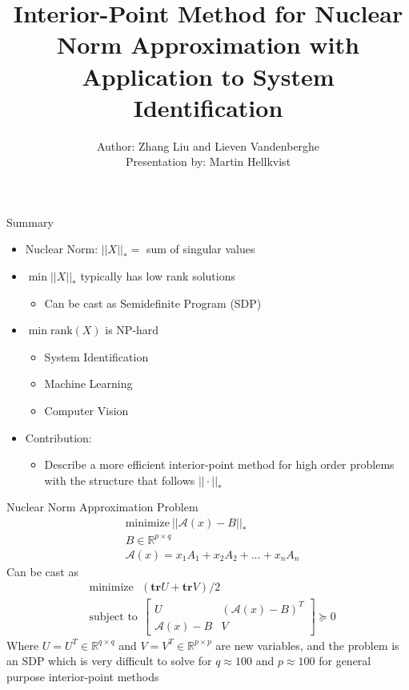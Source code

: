 \documentclass{beamer}
\title{Interior-Point Method for Nuclear Norm Approximation with Application to System Identification}
\author{Author: Zhang Liu and Lieven Vandenberghe \\ \footnotesize Presentation by: Martin Hellkvist}
\newcommand{\mA}{\mathcal{A}}
\begin{document}
\begin{frame}[plain]
    \maketitle
\end{frame}
\begin{frame}{Summary}
	\begin{itemize}
		\item Nuclear Norm: $ ||X||_* =$ sum of singular values
		\item $ \min ||X||_* $ typically has low rank solutions
		\begin{itemize}
			\item Can be cast as Semidefinite Program (SDP)
		\end{itemize}
		\item $ \min \text{rank}(X) $ is NP-hard
		\begin{itemize}
			\item System Identification
			\item Machine Learning
			\item Computer Vision
		\end{itemize}
		\item Contribution:
		\begin{itemize}
			\item Describe a more efficient interior-point method for high order problems with the structure that follows $ ||\cdot||_* $
		\end{itemize}
	\end{itemize}
\end{frame}

\begin{frame}{Nuclear Norm Approximation Problem}
	\begin{equation}
	\begin{split}
		&\text{minimize}~|| \mA (x) - B||_* \\
		&B \in \mathbb{R}^{p\times q}\\
		&\mA(x) = x_1A_1+x_2A_2+\dots+x_nA_n
	\end{split}
	\end{equation}
	Can be cast as
	\begin{equation}
	\begin{split}
		&\text{minimize}~~~(\mathbf{tr}U + \mathbf{tr}V)/2\\
		&\text{subject to}~~\begin{bmatrix}
		U & (\mA(x)-B)^T\\
		\mA(x) - B & V
		\end{bmatrix} \succeq 0
	\end{split}
	\end{equation}
	Where $ U = U^T \in \mathbb{R}^{q\times q}$ and $ V=V^T \in \mathbb{R}^{p \times p} $ are new variables, and the problem is an SDP which is very difficult to solve for $ q \approx 100 $ and $ p\approx 100 $ for general purpose interior-point methods
\end{frame}
\end{document}
